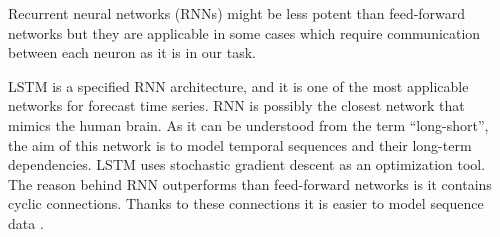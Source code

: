 


Recurrent neural networks (RNNs) might be less potent than feed-forward networks but they are applicable in some cases which require communication between each neuron as it is in our task.


LSTM is a specified RNN architecture, and it is one of the most applicable networks for forecast time series. RNN is possibly the closest network that mimics the human brain. As it can be understood from the term “long-short”, the aim of this network is to model temporal sequences and their long-term dependencies. LSTM uses stochastic gradient descent as an optimization tool. The reason behind RNN outperforms than feed-forward networks is it contains cyclic connections. Thanks to these connections it is easier to model sequence data \cite{sak2014long}.